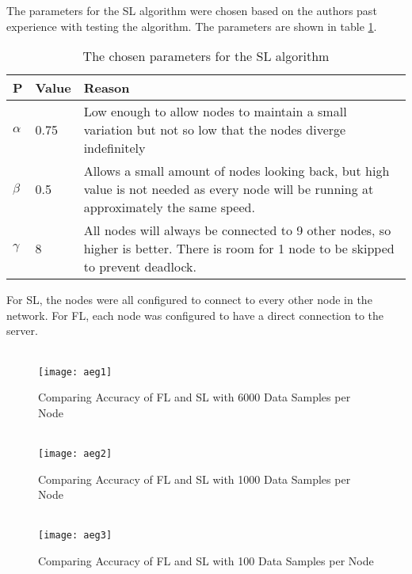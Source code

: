 The parameters for the SL algorithm were chosen based on the authors past experience with testing the algorithm. The parameters are shown in table \ref{slparamsDNP}.
\begin{table}[H]
	\begin{tabular}{p{0.5cm}|l|p{11cm}}
		P & Value & Reason \\ \hline \hline
		$\alpha$  & 0.75  & Low enough to allow nodes to maintain a small variation but not so low that the nodes diverge indefinitely                               \\ \hline
		$\beta$   & 0.5   & Allows a small amount of nodes looking back, but high value is not needed as every node will be running at approximately the same speed. \\ \hline
		$\gamma$  & 8     & All nodes will always be connected to 9 other nodes, so higher is better. There is room for 1 node to be skipped to prevent deadlock.   
	\end{tabular}
	\caption{The chosen parameters for the SL algorithm} \label{slparamsDNP}
\end{table}

For SL, the nodes were all configured to connect to every other node in the network. For FL, each node was configured to have a direct connection to the server.

\begin{figure}[H] 
	 \\
	\texttt{[image: aeg1]}
	\caption{Comparing Accuracy of FL and SL with 6000 Data Samples per Node}
	\label{aeg1}
\end{figure}

\begin{figure}[H]
	 \\
	\texttt{[image: aeg2]}
	\caption{Comparing Accuracy of FL and SL with 1000 Data Samples per Node}
	\label{aeg2}
\end{figure}

\begin{figure}[H]
	 \\
	\texttt{[image: aeg3]}
	\caption{Comparing Accuracy of FL and SL with 100 Data Samples per Node}
	\label{aeg3}
\end{figure}


